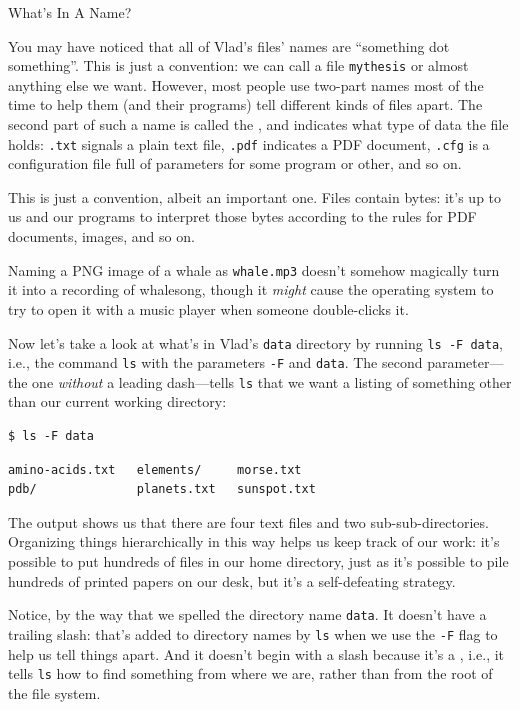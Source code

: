 \documentclass{book}
\begin{document}
\begin{swcbox}{What's In A Name?}

You may have noticed that all of Vlad's files' names are ``something dot
something''. This is just a convention: we can call a file
\texttt{mythesis} or almost anything else we want. However, most people
use two-part names most of the time to help them (and their programs)
tell different kinds of files apart. The second part of such a name is
called the , and
indicates what type of data the file holds: \texttt{.txt} signals a
plain text file, \texttt{.pdf} indicates a PDF document, \texttt{.cfg}
is a configuration file full of parameters for some program or other,
and so on.

This is just a convention, albeit an important one. Files contain bytes:
it's up to us and our programs to interpret those bytes according to the
rules for PDF documents, images, and so on.

Naming a PNG image of a whale as \texttt{whale.mp3} doesn't somehow
magically turn it into a recording of whalesong, though it \emph{might}
cause the operating system to try to open it with a music player when
someone double-clicks it.

\end{swcbox}

Now let's take a look at what's in Vlad's \texttt{data} directory by
running \texttt{ls -F data}, i.e., the command \texttt{ls} with the
parameters \texttt{-F} and \texttt{data}. The second parameter---the one
\emph{without} a leading dash---tells \texttt{ls} that we want a listing
of something other than our current working directory:

\begin{verbatim}
$ ls -F data
\end{verbatim}

\begin{verbatim}
amino-acids.txt   elements/     morse.txt
pdb/              planets.txt   sunspot.txt
\end{verbatim}

The output shows us that there are four text files and two
sub-sub-directories. Organizing things hierarchically in this way helps
us keep track of our work: it's possible to put hundreds of files in our
home directory, just as it's possible to pile hundreds of printed papers
on our desk, but it's a self-defeating strategy.

Notice, by the way that we spelled the directory name \texttt{data}. It
doesn't have a trailing slash: that's added to directory names by
\texttt{ls} when we use the \texttt{-F} flag to help us tell things
apart. And it doesn't begin with a slash because it's a
, i.e., it tells \texttt{ls}
how to find something from where we are, rather than from the root of
the file system.
\end{document}
